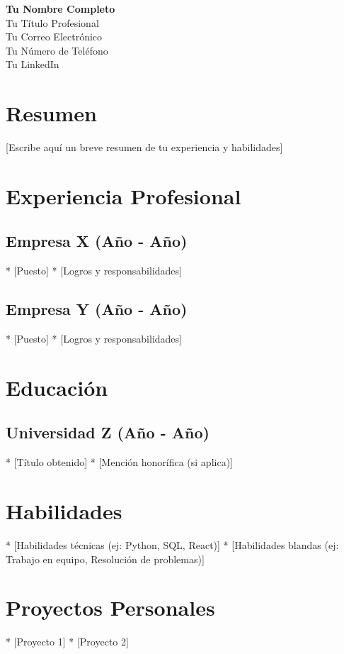 \documentclass{article}
\begin{document}
\begin{center}
    {\Huge \textbf{Tu Nombre Completo}} \\
    {\large Tu Título Profesional} \\
    {\large Tu Correo Electrónico} \\
    {\large Tu Número de Teléfono} \\
    {\large Tu LinkedIn}
\end{center}

\section{Resumen}
[Escribe aquí un breve resumen de tu experiencia y habilidades]

\section{Experiencia Profesional}
\subsection{Empresa X (Año - Año)}
* [Puesto]
* [Logros y responsabilidades]

\subsection{Empresa Y (Año - Año)}
* [Puesto]
* [Logros y responsabilidades]

\section{Educación}
\subsection{Universidad Z (Año - Año)}
* [Título obtenido]
* [Mención honorífica (si aplica)]

\section{Habilidades}
* [Habilidades técnicas (ej: Python, SQL, React)]
* [Habilidades blandas (ej: Trabajo en equipo, Resolución de problemas)]

\section{Proyectos Personales}
* [Proyecto 1]
* [Proyecto 2]
\end{document}
